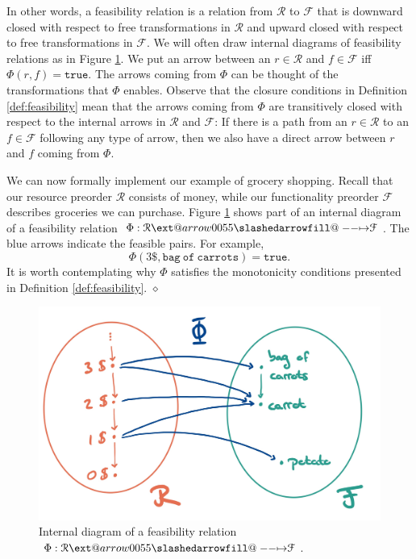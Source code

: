 \documentclass[12pt]{article}
\makeatletter
\theoremstyle{definition}
\theoremstyle{plain}
\theoremstyle{plain}
\theoremstyle{plain}
\theoremstyle{plain}
\theoremstyle{remark}
\newcommand{\continuation}{??}
\newenvironment{continueexample}[1]
{\renewcommand{\continuation}{\ref{#1}}\excont[continued]}
{\endexcont}
\newcommand\xqed[1]{%
	\leavevmode\unskip\penalty9999 \hbox{}\nobreak\hfill
	\quad\hbox{#1}}
\newcommand\exampleend{\xqed{$\diamond$}}
\theoremstyle{remark}
\newcommand{\mc}[1]{\mathcal{#1}}
\newcommand{\true}{\mathtt{true}}
\def\slashedarrowfill@#1#2#3#4#5{%
	$\m@th\thickmuskip0mu\medmuskip\thickmuskip\thinmuskip\thickmuskip
	\relax#5#1\mkern-7mu%
	\cleaders\hbox{$#5\mkern-2mu#2\mkern-2mu$}\hfill
	\mathclap{#3}\mathclap{#2}%
	\cleaders\hbox{$#5\mkern-2mu#2\mkern-2mu$}\hfill
	\mkern-7mu#4$%
}
\def\rightslashedarrowfill@{%
	\slashedarrowfill@\relbar\relbar\mapstochar\rightarrow}
\newcommand\xslashedrightarrow[2][]{%
	\ext@arrow 0055{\rightslashedarrowfill@}{#1}{#2}}
\makeatother
\begin{document}
In other words, a feasibility relation is a relation from $\mc{R}$ to $\mc{F}$ that is downward closed with respect to free transformations in $\mc{R}$ and upward closed with respect to free transformations in $\mc{F}$. We will often draw internal diagrams of feasibility relations as in Figure \ref{fig:internal feas}. We put an arrow between an $r \in \mc{R}$ and $f \in \mc{F}$ iff $\Phi(r,f) = \true$. The arrows coming from $\Phi$ can be thought of the transformations that $\Phi$ enables. Observe that the closure conditions in Definition \ref{def:feasibility} mean that the arrows coming from $\Phi$ are transitively closed with respect to the internal arrows in $\mc{R}$ and $\mc{F}$: If there is a path from an $r \in \mc{R}$ to an $f \in \mc{F}$ following any type of arrow, then we also have a direct arrow between $r$ and $f$ coming from $\Phi$.

\begin{continueexample}{ex:groceries}
	We can now formally implement our example of grocery shopping. Recall that our resource preorder $\mc{R}$ consists of money, while our functionality preorder $\mc{F}$ describes groceries we can purchase. Figure \ref{fig:internal feas} shows part of an internal diagram of a feasibility relation $\Phi: \mc{R} \xslashedrightarrow{} \mc{F}$. The blue arrows indicate the feasible pairs. For example, $$\Phi(3\$,\mathtt{bag\ of\ carrots}) = \true.$$ It is worth contemplating why $\Phi$ satisfies the monotonicity conditions presented in Definition \ref{def:feasibility}. 	\exampleend
	
	\begin{figure}
		\centering
		\includegraphics[width=350pt]{images/ex_groceries}
		\caption{Internal diagram of a feasibility relation $\Phi: \mc{R} \xslashedrightarrow{} \mc{F}$.}
		\label{fig:internal feas}
	\end{figure}

\end{continueexample}
\end{document}
